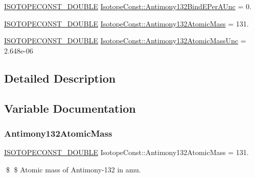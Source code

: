 \begin{DoxyCompactItemize}
\mbox{\hyperlink{group___isotope_const-_macros_ga8f45a7272ce02c0b4c65c44636ed719a}{I\+S\+O\+T\+O\+P\+E\+C\+O\+N\+S\+T\+\_\+\+D\+O\+U\+B\+LE}} \mbox{\hyperlink{group___isotope_const-_antimony-_sb132_ga9f239459f096d186c81183257644291a}{Isotope\+Const\+::\+Antimony132\+Bind\+E\+Per\+A\+Unc}} = 0.
\item 
\mbox{\hyperlink{group___isotope_const-_macros_ga8f45a7272ce02c0b4c65c44636ed719a}{I\+S\+O\+T\+O\+P\+E\+C\+O\+N\+S\+T\+\_\+\+D\+O\+U\+B\+LE}} \mbox{\hyperlink{group___isotope_const-_antimony-_sb132_ga11c3f48b7ffc33bd1d15a9287415d148}{Isotope\+Const\+::\+Antimony132\+Atomic\+Mass}} = 131.
\item 
\mbox{\hyperlink{group___isotope_const-_macros_ga8f45a7272ce02c0b4c65c44636ed719a}{I\+S\+O\+T\+O\+P\+E\+C\+O\+N\+S\+T\+\_\+\+D\+O\+U\+B\+LE}} \mbox{\hyperlink{group___isotope_const-_antimony-_sb132_ga7f9aff3e9298d56eaa8123c3e3d4c105}{Isotope\+Const\+::\+Antimony132\+Atomic\+Mass\+Unc}} = 2.\+648e-\/06
\end{DoxyCompactItemize}


\subsection{Detailed Description}


\subsection{Variable Documentation}
\mbox{\label{group___isotope_const-_antimony-_sb132_ga11c3f48b7ffc33bd1d15a9287415d148}} 
\subsubsection{\texorpdfstring{Antimony132\+Atomic\+Mass}{Antimony132AtomicMass}}
{\footnotesize\ttfamily \mbox{\hyperlink{group___isotope_const-_macros_ga8f45a7272ce02c0b4c65c44636ed719a}{I\+S\+O\+T\+O\+P\+E\+C\+O\+N\+S\+T\+\_\+\+D\+O\+U\+B\+LE}} Isotope\+Const\+::\+Antimony132\+Atomic\+Mass = 131.}

\$ \$ Atomic mass of Antimony-\/132 in amu. \mbox{\label{group___isotope_const-_antimony-_sb132_ga7f9aff3e9298d56eaa8123c3e3d4c105}} 
